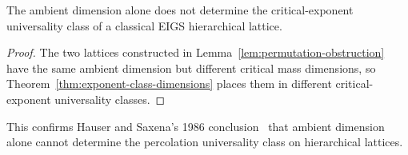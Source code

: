 \begin{corollary}\label{cor:ambient-does-not-classify}
The ambient dimension alone does not determine the critical-exponent universality class of a classical EIGS hierarchical lattice.
\end{corollary}
\begin{proof}
The two lattices constructed in Lemma~\ref{lem:permutation-obstruction} have the same ambient dimension but different critical mass dimensions, so Theorem~\ref{thm:exponent-class-dimensions} places them in different critical-exponent universality classes.
\end{proof}

This confirms Hauser and Saxena's 1986 conclusion~\cite{hauser1986geometrical} that ambient dimension alone cannot determine the percolation universality class on hierarchical lattices.












